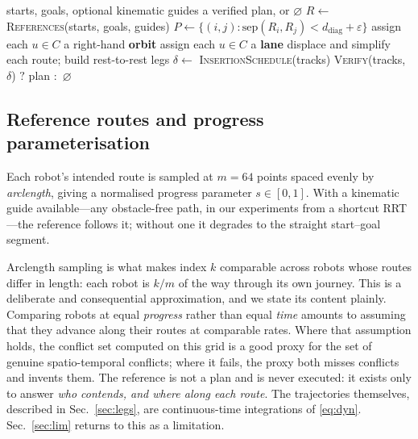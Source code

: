 \documentclass[conference]{IEEEtran}
\begin{document}
\begin{algorithm}[t]
\caption{Conflict-derived constructive planning}
\label{alg:main}
\begin{algorithmic}[1]
\Require starts, goals, optional kinematic guides
\Ensure a verified plan, or $\varnothing$
\State $R \gets$ \textsc{References}(starts, goals, guides)
\State $P \gets \{(i,j) : \mathrm{sep}(R_i,R_j) < d_{\mathrm{diag}} + \varepsilon\}$
   
    \State assign each $u \in C$ a right-hand \textbf{orbit} 
  \Else
    \State assign each $u \in C$ a \textbf{lane} 
  \EndIf
\EndFor
\State displace and simplify each route; build rest-to-rest legs
\State $\delta \gets$ \textsc{InsertionSchedule}(tracks) 
\State \Return \textsc{Verify}(tracks, $\delta$) $?$ plan $:$ $\varnothing$
\end{algorithmic}
\end{algorithm}

\subsection{Reference routes and progress parameterisation}
\label{sec:refs}

Each robot's intended route is sampled at $m = 64$ points spaced evenly by
\emph{arclength}, giving a normalised progress parameter $s \in [0,1]$. With a kinematic
guide available---any obstacle-free path, in our experiments from a shortcut RRT---the
reference follows it; without one it degrades to the straight start--goal segment.

Arclength sampling is what makes index $k$ comparable across robots whose routes differ in
length: each robot is $k/m$ of the way through its own journey. This is a deliberate and
consequential approximation, and we state its content plainly. Comparing robots at equal
\emph{progress} rather than equal \emph{time} amounts to assuming that they advance along
their routes at comparable rates. Where that assumption holds, the conflict set computed on
this grid is a good proxy for the set of genuine spatio-temporal conflicts; where it fails,
the proxy both misses conflicts and invents them. The reference is not a plan and is never
executed: it exists only to answer \emph{who contends, and where along each route}. The
trajectories themselves, described in Sec.~\ref{sec:legs}, are continuous-time
integrations of \eqref{eq:dyn}. Sec.~\ref{sec:lim} returns to this as a limitation.
\end{document}
